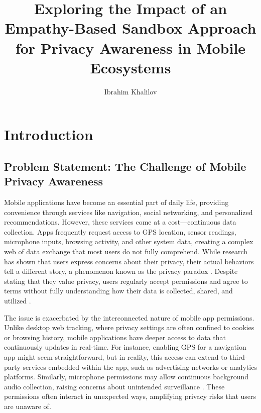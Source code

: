 \documentclass[acmlarge, nonacm]{acmart}
\begin{document}
\title{Exploring the Impact of an Empathy-Based Sandbox
Approach for Privacy Awareness in Mobile Ecosystems}

\author{Ibrahim Khalilov}

\maketitle

\section{Introduction}

\subsection{Problem Statement: The Challenge of Mobile Privacy Awareness}

Mobile applications have become an essential part of daily life, providing convenience through services like navigation, social networking, and personalized recommendations. However, these services come at a cost—continuous data collection. Apps frequently request access to GPS location, sensor readings, microphone inputs, browsing activity, and other system data, creating a complex web of data exchange that most users do not fully comprehend. While research has shown that users express concerns about their privacy, their actual behaviors tell a different story, a phenomenon known as the privacy paradox \cite{baruh2017big}. Despite stating that they value privacy, users regularly accept permissions and agree to terms without fully understanding how their data is collected, shared, and utilized \cite{kokolakis2017privacy}.

The issue is exacerbated by the interconnected nature of mobile app permissions. Unlike desktop web tracking, where privacy settings are often confined to cookies or browsing history, mobile applications have deeper access to data that continuously updates in real-time. For instance, enabling GPS for a navigation app might seem straightforward, but in reality, this access can extend to third-party services embedded within the app, such as advertising networks or analytics platforms. Similarly, microphone permissions may allow continuous background audio collection, raising concerns about unintended surveillance \cite{Gao2019}. These permissions often interact in unexpected ways, amplifying privacy risks that users are unaware of.
\end{document}
